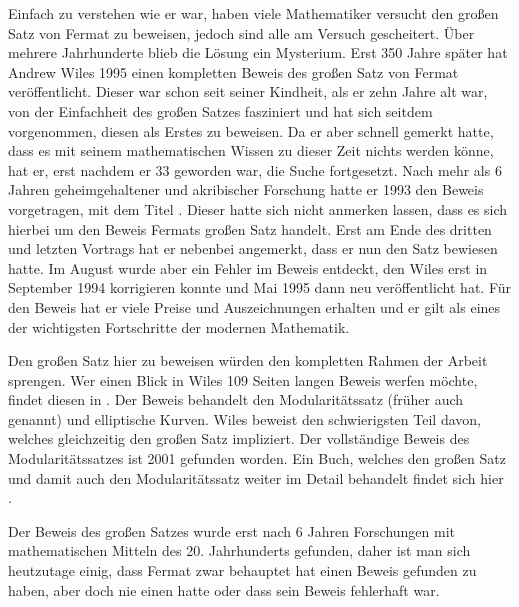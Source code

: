 Einfach zu verstehen wie er war, haben viele Mathematiker versucht den großen Satz von Fermat zu beweisen, jedoch sind alle am Versuch gescheitert. Über mehrere Jahrhunderte blieb die Lösung ein Mysterium. Erst 350 Jahre später hat Andrew Wiles 1995 einen kompletten Beweis des großen Satz von Fermat veröffentlicht. Dieser war schon seit seiner Kindheit, als er zehn Jahre alt war, von der Einfachheit des großen Satzes fasziniert und hat sich seitdem vorgenommen, diesen als Erstes zu beweisen. Da er aber schnell gemerkt hatte, dass es mit seinem mathematischen Wissen zu dieser Zeit nichts werden könne, hat er, erst nachdem er 33 geworden war, die Suche fortgesetzt. Nach mehr als 6 Jahren geheimgehaltener und akribischer Forschung hatte er 1993 den Beweis vorgetragen, mit dem Titel . Dieser hatte sich nicht anmerken lassen, dass es sich hierbei um den Beweis Fermats großen Satz handelt. Erst am Ende des dritten und letzten Vortrags hat er nebenbei angemerkt, dass er nun den Satz bewiesen hatte. \cite{newYorkTimes} Im August wurde aber ein Fehler im Beweis entdeckt, den Wiles erst in September 1994 korrigieren konnte und Mai 1995 dann neu veröffentlicht hat. Für den Beweis hat er viele Preise und Auszeichnungen erhalten und er gilt als eines der wichtigsten Fortschritte der modernen Mathematik.

Den großen Satz hier zu beweisen würden den kompletten Rahmen der Arbeit sprengen. Wer einen Blick in Wiles 109 Seiten langen Beweis werfen möchte, findet diesen in \cite{wilesFermat}. Der Beweis behandelt den Modularitätssatz (früher auch  genannt) und elliptische Kurven. Wiles beweist den schwierigsten Teil davon, welches gleichzeitig den großen Satz impliziert. Der vollständige Beweis des Modularitätssatzes ist 2001 gefunden worden. Ein Buch, welches den großen Satz und damit auch den Modularitätssatz weiter im Detail behandelt findet sich hier \cite{darmon}.

Der Beweis des großen Satzes wurde erst nach 6 Jahren Forschungen mit mathematischen Mitteln des 20. Jahrhunderts gefunden, daher ist man sich heutzutage einig, dass Fermat zwar behauptet hat einen Beweis gefunden zu haben, aber doch nie einen hatte oder dass sein Beweis fehlerhaft war.
